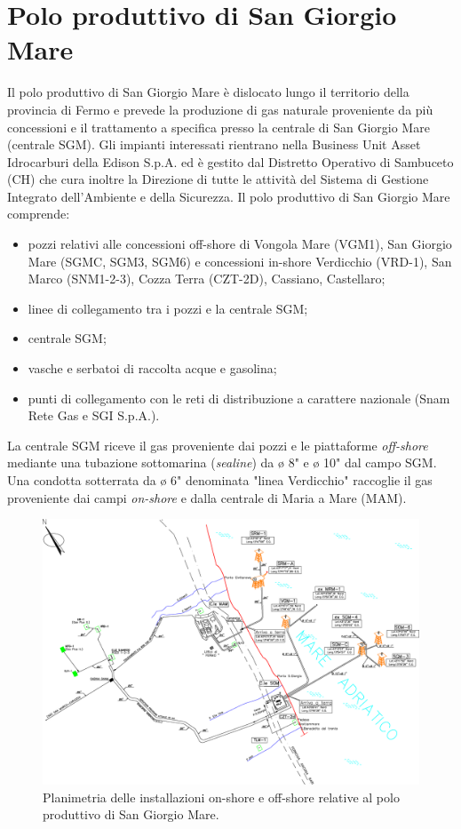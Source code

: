 \section{Polo produttivo di San Giorgio Mare}
Il polo produttivo di San Giorgio Mare è dislocato lungo il territorio della provincia di Fermo e prevede la produzione di gas naturale proveniente da più concessioni e il trattamento a specifica presso la centrale di San Giorgio Mare (centrale SGM). Gli impianti interessati rientrano nella Business Unit Asset Idrocarburi della Edison S.p.A. ed è gestito dal Distretto Operativo di Sambuceto (CH) che cura inoltre la Direzione di tutte le attività del Sistema di Gestione Integrato dell'Ambiente e della Sicurezza. Il polo produttivo di San Giorgio Mare comprende:
\begin{itemize}
	\item pozzi relativi alle concessioni off-shore di Vongola Mare (VGM1), San Giorgio Mare (SGMC, SGM3, SGM6) e concessioni in-shore Verdicchio (VRD-1), San Marco (SNM1-2-3), Cozza Terra (CZT-2D), Cassiano, Castellaro;
	\item linee di collegamento tra i pozzi e la centrale SGM;
	\item centrale SGM;
	\item vasche e serbatoi di raccolta acque e gasolina;
	\item punti di collegamento con le reti di distribuzione a carattere nazionale (Snam Rete Gas e SGI S.p.A.).
\end{itemize}
La centrale SGM riceve il gas proveniente dai pozzi e le piattaforme \textit{off-shore} mediante una tubazione sottomarina (\textit{sealine}) da ø 8" e ø 10" dal campo SGM. %
Una condotta sotterrata da ø 6" denominata "linea Verdicchio" raccoglie il gas proveniente dai campi \textit{on-shore} e dalla centrale di Maria a Mare (MAM).

\begin{figure}[htbp]
	\centering
	\includegraphics[width=\textwidth]{fig/test/asset.eps}
	\caption{Planimetria delle installazioni on-shore e off-shore relative al polo produttivo di San Giorgio Mare.}
	\label{fig:asset}
\end{figure}

